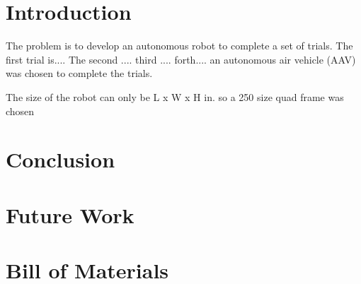 \documentclass{article}
\begin{document}
\clearpage

\section{Introduction}

	The problem is to develop an autonomous robot to complete a set of trials. The first trial is.... The second .... third .... forth.... an autonomous air vehicle (AAV) was chosen to complete the trials. 
	
	The size of the robot can only be L x W x H in. so a 250 size quad frame was chosen 

\section{Conclusion}


\section{Future Work}

\section{Bill of Materials}
\end{document}
